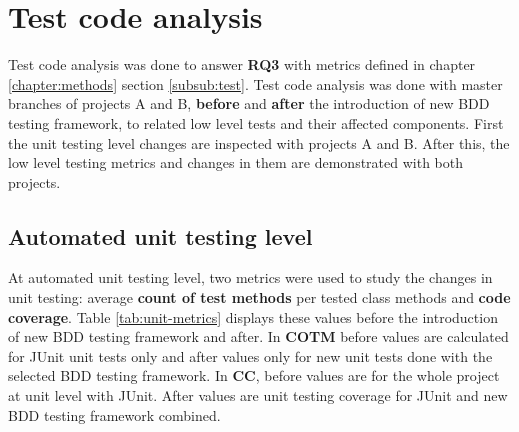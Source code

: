     \begin{table}[H]
            \caption {Developer perception towards \textit{Spectrum/Spock}} \label{tab:spock-spectrum-pt3}

    \end{table}

    \clearpage
\restoregeometry

\section{Test code analysis}
Test code analysis was done to answer \textbf{RQ3} with metrics defined in chapter \ref{chapter:methods} section \ref{subsub:test}.
Test code analysis was done with master branches of projects A and B, \textbf{before} and \textbf{after} the introduction of new BDD testing framework, to related
low level tests and their affected components. First the unit testing level changes are inspected with projects A and B.
After this, the low level testing metrics and changes in them are demonstrated with both projects.

\subsection{Automated unit testing level}
At automated unit testing level, two metrics were used to study the changes in unit testing: average \textbf{count of test methods}
per tested class methods and \textbf{code coverage}. Table \ref{tab:unit-metrics} displays these values before the introduction
of new BDD testing framework and after. In \textbf{COTM} before values are calculated for JUnit unit tests only and after
values only for new unit tests done with the selected BDD testing framework. In \textbf{CC}, before values are for the
whole project at unit level with JUnit. After values are unit testing coverage for JUnit and new BDD testing framework
combined.

